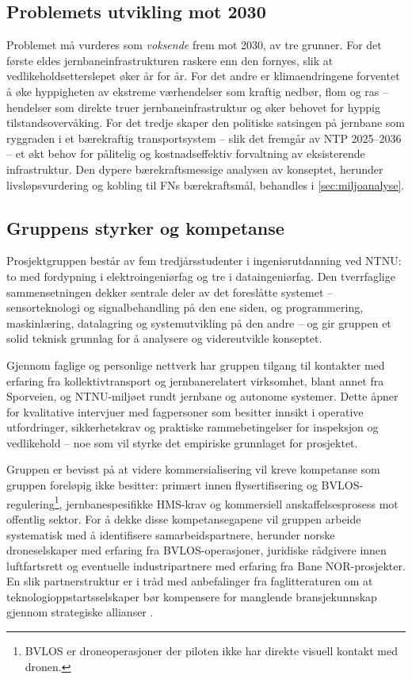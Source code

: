 \subsection{Problemets utvikling mot 2030}

Problemet må vurderes som \textit{voksende} frem mot 2030, av tre grunner. For det første eldes jernbaneinfrastrukturen raskere enn den fornyes, slik at vedlikeholdsetterslepet øker år for år. For det andre er klimaendringene forventet å øke hyppigheten av ekstreme værhendelser som kraftig nedbør, flom og ras -- hendelser som direkte truer jernbaneinfrastruktur og øker behovet for hyppig tilstandsovervåking. For det tredje skaper den politiske satsingen på jernbane som ryggraden i et bærekraftig transportsystem -- slik det fremgår av NTP 2025--2036 \parencite{jernbanedirektoratet_ntp_2025} -- et økt behov for pålitelig og kostnadseffektiv forvaltning av eksisterende infrastruktur. Den dypere bærekraftsmessige analysen av konseptet, herunder livsløpsvurdering og kobling til FNs bærekraftsmål, behandles i \cref{sec:miljoanalyse}.

\subsection{Gruppens styrker og kompetanse}

Prosjektgruppen består av fem tredjårsstudenter i ingeniørutdanning ved NTNU: to med fordypning i elektroingeniørfag og tre i dataingeniørfag. Den tverrfaglige sammensetningen dekker sentrale deler av det foreslåtte systemet -- sensorteknologi og signalbehandling på den ene siden, og programmering, maskinlæring, datalagring og systemutvikling på den andre -- og gir gruppen et solid teknisk grunnlag for å analysere og videreutvikle konseptet.

Gjennom faglige og personlige nettverk har gruppen tilgang til kontakter med erfaring fra kollektivtransport og jernbanerelatert virksomhet, blant annet fra Sporveien, og NTNU-miljøet rundt jernbane og autonome systemer. Dette åpner for kvalitative intervjuer med fagpersoner som besitter innsikt i operative utfordringer, sikkerhetskrav og praktiske rammebetingelser for inspeksjon og vedlikehold -- noe som vil styrke det empiriske grunnlaget for prosjektet.

Gruppen er bevisst på at videre kommersialisering vil kreve kompetanse som gruppen foreløpig ikke besitter: primært innen flysertifisering og BVLOS-regulering\footnote{BVLOS er droneoperasjoner der piloten ikke har direkte visuell kontakt med dronen.}, jernbanespesifikke HMS-krav og kommersiell anskaffelsesprosess mot offentlig sektor. For å dekke disse kompetansegapene vil gruppen arbeide systematisk med å identifisere samarbeidspartnere, herunder norske droneselskaper med erfaring fra BVLOS-operasjoner, juridiske rådgivere innen luftfartsrett og eventuelle industripartnere med erfaring fra Bane NOR-prosjekter. En slik partnerstruktur er i tråd med anbefalinger fra faglitteraturen om at teknologioppstartsselskaper bør kompensere for manglende bransjekunnskap gjennom strategiske allianser \parencite{torvatn_teknologiledelse_2024}.

